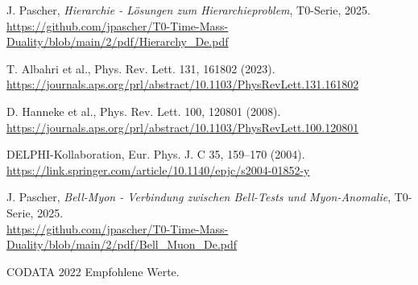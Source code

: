 \documentclass[12pt,a4paper]{article}
\theoremstyle{definition}
\begin{document}
\begin{thebibliography}{99}
		 J. Pascher, \textit{Hierarchie - Lösungen zum Hierarchieproblem}, T0-Serie, 2025. \\
		\url{https://github.com/jpascher/T0-Time-Mass-Duality/blob/main/2/pdf/Hierarchy_De.pdf}
		
		 T. Albahri et al., Phys. Rev. Lett. 131, 161802 (2023). \\
		\url{https://journals.aps.org/prl/abstract/10.1103/PhysRevLett.131.161802}
		
		 D. Hanneke et al., Phys. Rev. Lett. 100, 120801 (2008). \\
		\url{https://journals.aps.org/prl/abstract/10.1103/PhysRevLett.100.120801}
		
		 DELPHI-Kollaboration, Eur. Phys. J. C 35, 159--170 (2004). \\
		\url{https://link.springer.com/article/10.1140/epjc/s2004-01852-y}
		
		 J. Pascher, \textit{Bell-Myon - Verbindung zwischen Bell-Tests und Myon-Anomalie}, T0-Serie, 2025. \\
		\url{https://github.com/jpascher/T0-Time-Mass-Duality/blob/main/2/pdf/Bell_Muon_De.pdf}
		
		 CODATA 2022 Empfohlene Werte.
	\end{thebibliography}
	
\end{document}
